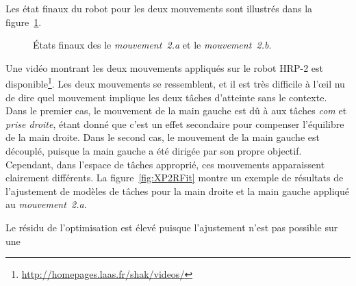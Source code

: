 Les état finaux du robot pour les deux mouvements sont illustrés dans la figure~\ref{fig:spotDiffbis}.
\begin{figure}[t]
  \centering
  \caption[Mouvements d'atteintes.]{États finaux des le \emph{mouvement~2.a} et le \emph{mouvement~2.b}.}
  \label{fig:spotDiffbis}
\end{figure}
Une vidéo montrant les deux mouvements appliqués sur le robot 
HRP-2 est disponible\footnote{\url{http://homepages.laas.fr/shak/videos/}}.
Les deux mouvements se ressemblent, et il est très difficile à l'\oe{}il nu
de dire quel mouvement implique les deux t\^aches d'atteinte sans le contexte.
Dans le premier cas, le mouvement de la main gauche est dû à aux t\^aches \emph{com}
et \emph{prise droite}, étant donné que c'est un effet secondaire pour compenser
l'équilibre de la main droite.
Dans le second cas, le mouvement de la main gauche est découplé,
puisque la main gauche a été dirigée par son propre objectif.
Cependant, dans l'espace de t\^aches approprié, ces mouvements apparaissent
clairement différents.
La figure~\ref{fig:XP2RFit} montre un exemple de résultats de l'ajustement de 
modèles de t\^aches pour la main droite et la main gauche appliqué au \emph{mouvement~2.a}.
\begin{figure*}[p]
\centering
\subfigure{
  \resizebox{.47\textwidth}{!} {
      
      }      }
      \subfigure{
  \resizebox{.47\textwidth}{!} {
      
      }            }
\caption[Ajustement de modèle de t\^ache sur le \emph{mouvement~2.a}.]{L'ajustement de modèle de t\^ache sur le \emph{mouvement~2.a} sur les t\^aches de la 
main droite et gauche. La variable $r$ est le résidu,                                                         
\ie~la distance entre deux courbes. Le mouvement de la main droite est correctement ajusté par
le modèle de la t\^ache, montrant que la t\^ache est active. Le mouvement
de la main gauche n'est pas ajusté correctement, puisque la t\^ache est inactive.
Les deux cas sont facilement distinguables gr\^ace à la valeur du résidu.} 
\label{fig:XP2RFit}
\end{figure*}
Le résidu de l'optimisation est élevé puisque l'ajustement n'est pas possible sur une 
